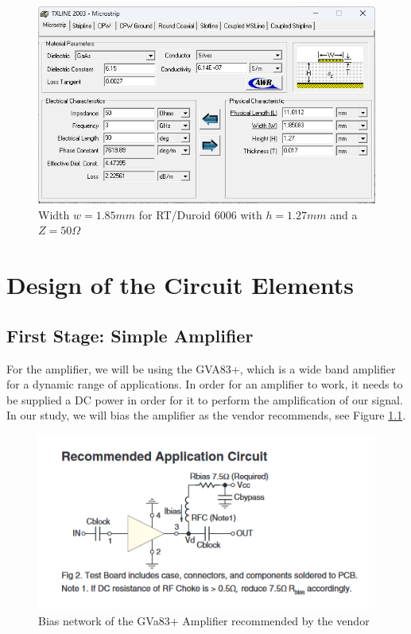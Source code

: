 \documentclass[12pt]{report} %
\let\oldsection\section
\renewcommand\section{\clearpage\oldsection}
\begin{document}
\begin{figure}[htbp]
    \centering
    \includegraphics[width=\textwidth]{images/previous_work/txline_tool_duroid_6006_h_1_27_mm_50_ohm.png}
    \caption{Width $w = 1.85 mm$ for RT/Duroid 6006 with $h = 1.27 mm$ and a $Z = 50 \Omega$}
    \label{fig:previous_work:duroid_6006_h_1_27_mm_50_ohm}
\end{figure}

\chapter{Design of the Circuit Elements}
\section{First Stage: Simple Amplifier}

For the amplifier, we will be using the GVA83+, which is a wide band amplifier for a dynamic range of applications. In order for an amplifier to work, it needs to be supplied a DC power in order for it to perform the amplification of our signal. In our study, we will bias the amplifier as the vendor recommends, see Figure \ref{fig:design_circuit_elements:gva83+_bias_configuration}. 

\begin{figure}[htbp]
    \centering
    \includegraphics[width=\textwidth]{images/design_circuit_elements/gva83+_bias_configuration.png}
    \caption{Bias network of the GVa83+ Amplifier recommended by the vendor}
    \label{fig:design_circuit_elements:gva83+_bias_configuration}
\end{figure}
\end{document}
